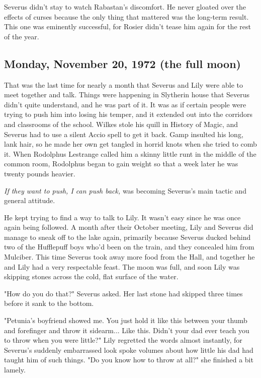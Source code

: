 \documentclass[a4paper,11pt]{article}
\begin{document}
Severus didn't stay to watch Rabastan's discomfort. He never gloated over the effects of curses because the only thing that mattered was the long-term result. This one was eminently successful, for Rosier didn't tease him again for the rest of the year.

\subsection{Monday, November 20, 1972 (the full moon)}

That was the last time for nearly a month that Severus and Lily were able to meet together and talk. Things were happening in Slytherin house that Severus didn't quite understand, and he was part of it. It was as if certain people were trying to push him into losing his temper, and it extended out into the corridors and classrooms of the school. Wilkes stole his quill in History of Magic, and Severus had to use a silent Accio spell to get it back. Gamp insulted his long, lank hair, so he made her own get tangled in horrid knots when she tried to comb it. When Rodolphus Lestrange called him a skinny little runt in the middle of the common room, Rodolphus began to gain weight so that a week later he was twenty pounds heavier.

\emph{If they want to push, I can push back,} was becoming Severus's main tactic and general attitude.

He kept trying to find a way to talk to Lily. It wasn't easy since he was once again being followed. A month after their October meeting, Lily and Severus did manage to sneak off to the lake again, primarily because Severus ducked behind two of the Hufflepuff boys who'd been on the train, and they concealed him from Mulciber. This time Severus took away more food from the Hall, and together he and Lily had a very respectable feast. The moon was full, and soon Lily was skipping stones across the cold, flat surface of the water.

"How do you do that?" Severus asked. Her last stone had skipped three times before it sank to the bottom.

"Petunia's boyfriend showed me. You just hold it like this between your thumb and forefinger and throw it sidearm... Like this. Didn't your dad ever teach you to throw when you were little?" Lily regretted the words almost instantly, for Severus's suddenly embarrassed look spoke volumes about how little his dad had taught him of such things. "Do you know how to throw at all?" she finished a bit lamely.
\end{document}
